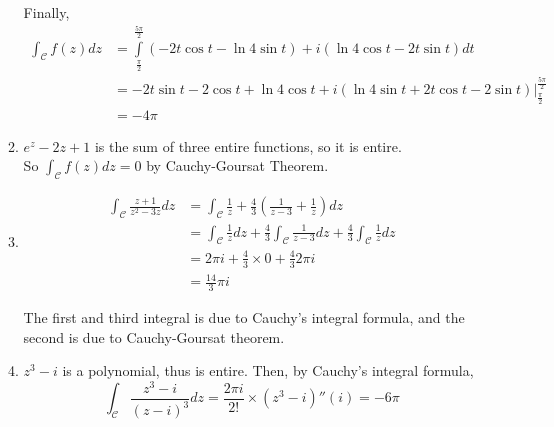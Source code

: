 \documentclass[12pt]{article}
\newcommand{\curve}{\mathcal{C}}
\newcommand{\integral}{\int\limits}
\begin{document}
\begin{enumerate}
\begin{enumerate}
        Finally,
        \begin{align*}
            \int_\curve f(z)dz &= \integral^{\frac{5\pi}{2}}_{\frac{\pi}{2}}  (-2t\cos t - \ln4 \sin t )+ i(\ln4 \cos t - 2t\sin t) dt\\
            & =\left. -2t\sin t -2\cos t + \ln4 \cos t + i (\ln4 \sin t + 2t\cos t - 2\sin t) \right\vert ^{\frac{5\pi}{2}}_{\frac{\pi}{2}}\\
            &= -4\pi
        \end{align*}
        \pagebreak
        \item $e^z-2z+ 1$ is the sum of three entire functions, so it is entire. \\So $\int_\curve f(z)dz = 0$ by Cauchy-Goursat Theorem.
        \item \begin{align*}
        \int_\curve \frac{z+1}{z^2-3z}dz &= \int_\curve \frac{1}{z} + \frac{4}{3} \left(\frac{1}{z-3} + \frac{1}{z}\right) dz \\
        &= \int_\curve \frac{1}{z}dz + \frac{4}{3} \int_\curve \frac{1}{z-3} dz + \frac{4}{3}\int_\curve \frac{1}{z} dz\\
        &= 2\pi i + \frac{4}{3} \times 0 + \frac{4}{3} 2\pi i \\
        &= \frac{14}{3} \pi i
        \end{align*}

        The first and third integral is due to Cauchy's integral formula, and the second is due to Cauchy-Goursat theorem.

    \item $z^3- i$ is a polynomial, thus is entire. Then, by Cauchy's integral formula,  $$\int_\curve \frac{z^3-i}{(z-i)^3}dz = \frac{2\pi i}{2!}\times (z^3 - i)''(i) = -6\pi$$
    \end{enumerate}

\end{enumerate}
\end{document}
